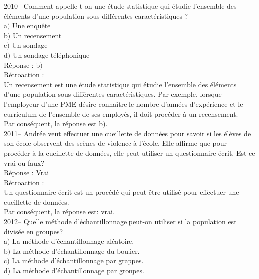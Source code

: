 \documentclass[letterpaper, 12pt]{article}
\begin{document}

2010-- Comment appelle-t-on une \'etude statistique qui \'etudie l'ensemble des \'el\'ements d'une population sous diff\'erentes caract\'eristiques ? \\

a$)$ Une enqu\^ete\\
b$)$ Un recensement\\
c$)$ Un sondage\\
d$)$ Un sondage t\'el\'ephonique\\

R\'eponse : b$)$\\

R\'etroaction :\\
Un recensement est une \'etude statistique qui \'etudie l'ensemble des \'el\'ements d'une population sous diff\'erentes caract\'eristiques. Par exemple, lorsque l'employeur d'une PME d\'esire conna\^itre le nombre d'ann\'ees d'exp\'erience et le curriculum de l'ensemble de ses employ\'es, il doit proc\'eder \`a un recensement.\\
Par cons\'equent, la r\'eponse est b).\\

2011-- Andr\'ee veut effectuer une cueillette de donn\'ees pour savoir si les \'el\`eves de son \'ecole observent des sc\`enes de violence \`a l'\'ecole. Elle affirme que pour proc\'eder \`a la cueillette de donn\'ees, elle peut utiliser un questionnaire \'ecrit. Est-ce vrai ou faux?\\

R\'eponse : Vrai\\

R\'etroaction :\\
Un questionnaire \'ecrit est un proc\'ed\'e qui peut \^etre utilis\'e pour effectuer une cueillette de donn\'ees. \\
Par cons\'equent, la r\'eponse est: vrai.\\


2012-- Quelle m\'ethode d'\'echantillonnage peut-on utiliser si la population est divis\'ee en groupes? \\
a$)$ La m\'ethode d'\'echantillonnage al\'eatoire.\\
b$)$ La m\'ethode d'\'echantillonnage du boulier.\\
c$)$ La m\'ethode d'\'echantillonnage par grappes.\\
d$)$ La m\'ethode d'\'echantillonnage par groupes.\\
\end{document}
